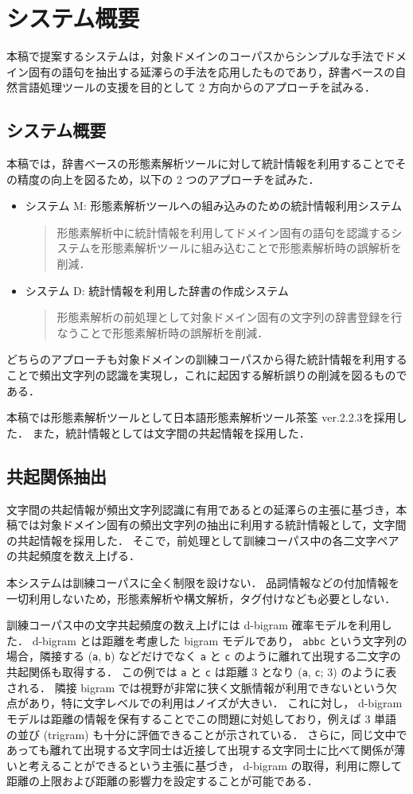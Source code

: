 \section{システム概要}
本稿で提案するシステムは，対象ドメインのコーパスからシンプルな手法でドメイン固有の語句を抽出する延澤らの手法\cite{nobesawa01anlp}を応用したものであり，辞書ベースの自然言語処理ツールの支援を目的として 2 方向からのアプローチを試みる．
\subsection{システム概要}
本稿では，辞書ベースの形態素解析ツールに対して統計情報を利用することでその精度の向上を図るため，以下の 2 つのアプローチを試みた．
\begin{itemize}
\item システム M: 形態素解析ツールへの組み込みのための統計情報利用システム
\begin{quote}
形態素解析中に統計情報を利用してドメイン固有の語句を認識するシステムを形態素解析ツールに組み込むことで形態素解析時の誤解析を削減．
\end{quote}
\item システム D: 統計情報を利用した辞書の作成システム
\begin{quote}
形態素解析の前処理として対象ドメイン固有の文字列の辞書登録を行なうことで形態素解析時の誤解析を削減．
\end{quote}
\end{itemize}
どちらのアプローチも対象ドメインの訓練コーパスから得た統計情報を利用することで頻出文字列の認識を実現し，これに起因する解析誤りの削減を図るものである．

本稿では形態素解析ツールとして日本語形態素解析ツール茶筌 ver.2.2.3\cite{chasen}を採用した．
また，統計情報としては文字間の共起情報を採用した．
\subsection{共起関係抽出}
文字間の共起情報が頻出文字列認識に有用であるとの延澤らの主張\cite{nobesawa01anlp}に基づき，本稿では対象ドメイン固有の頻出文字列の抽出に利用する統計情報として，文字間の共起情報を採用した．
そこで，前処理として訓練コーパス中の各二文字ペアの共起頻度を数え上げる．

本システムは訓練コーパスに全く制限を設けない．
品詞情報などの付加情報を一切利用しないため，形態素解析や構文解析，タグ付けなども必要としない．

訓練コーパス中の文字共起頻度の数え上げには d-bigram 確率モデル\cite{tsutsumi93}を利用した．
d-bigram とは距離を考慮した bigram モデルであり， {\tt abbc} という文字列の場合，隣接する ({\tt a}, {\tt b}) などだけでなく {\tt a} と {\tt c} のように離れて出現する二文字の共起関係も取得する．
この例では {\tt a} と {\tt c} は距離 3 となり ({\tt a}, {\tt c}; 3) のように表される．
隣接 bigram では視野が非常に狭く文脈情報が利用できないという欠点があり，特に文字レベルでの利用はノイズが大きい．
これに対し， d-bigram モデルは距離の情報を保有することでこの問題に対処しており，例えば 3 単語の並び (trigram) も十分に評価できることが示されている\cite{tsutsumi96}．
さらに，同じ文中であっても離れて出現する文字同士は近接して出現する文字同士に比べて関係が薄いと考えることができる\cite{church89acl}という主張に基づき， d-bigram の取得，利用に際して距離の上限および距離の影響力を設定することが可能である．
